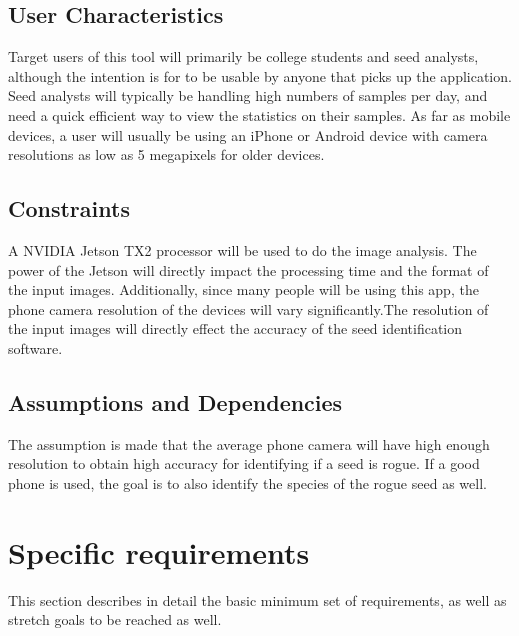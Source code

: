 \documentclass[onecolumn, draftclsnofoot,10pt, compsoc]{IEEEtran}
\begin{document}
\subsection{User Characteristics}
Target users of this tool will primarily be college students and seed analysts, although the intention is for to be usable by anyone that picks up the application. Seed analysts will typically be handling high numbers of samples per day, and need a quick efficient way to view the statistics on their samples. As far as mobile devices, a user will usually be using an iPhone or Android device with camera resolutions as low as 5 megapixels for older devices. 

\subsection{Constraints}
A NVIDIA Jetson TX2 processor will be used to do the image analysis.
The power of the Jetson will directly impact the processing time and the format of the input images. Additionally, since many people will be using this app, the phone camera resolution of the devices will vary significantly.The resolution of the input images will directly effect the accuracy of the seed identification software. 

\subsection{Assumptions and Dependencies}
The assumption is made that the average phone camera will have high enough resolution to obtain high accuracy for identifying if a seed is rogue. If a good phone is used, the goal is to also identify the species of the rogue seed as well. 

\section{Specific requirements}
This section describes in detail the basic minimum set of requirements, as well as stretch goals to be reached as well. 
\end{document}
